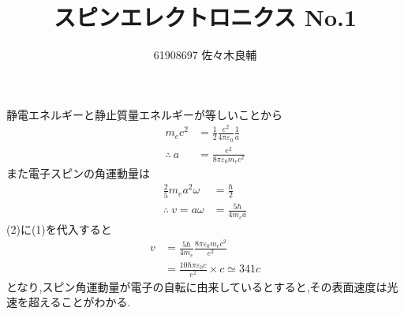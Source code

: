 \documentclass[uplatex,a4j,11pt,dvipdfmx]{jsarticle}
\begin{document}
\title{スピンエレクトロニクス No.1}
\author{61908697 佐々木良輔}
\date{}
\maketitle
静電エネルギーと静止質量エネルギーが等しいことから
\begin{align}
  m_ec^2&=\frac{1}{2}\frac{e^2}{4\pi\varepsilon_0}\frac{1}{a}\nonumber\\
  \therefore\ a&=\frac{e^2}{8\pi\varepsilon_0m_ec^2}
\end{align}
また電子スピンの角運動量は
\begin{align}
  \frac{2}{5}m_ea^2\omega&=\frac{\hbar}{2}\nonumber\\
  \therefore\ v=a\omega&=\frac{5\hbar}{4m_ea}
\end{align}
(2)に(1)を代入すると
\begin{align*}
  v&=\frac{5\hbar}{4m_e}\frac{8\pi\varepsilon_0m_ec^2}{e^2}\\
  &=\frac{10\hbar\pi\varepsilon_0c}{e^2}\times c\simeq 341c
\end{align*}
となり,スピン角運動量が電子の自転に由来しているとすると,その表面速度は光速を超えることがわかる.
\end{document}
